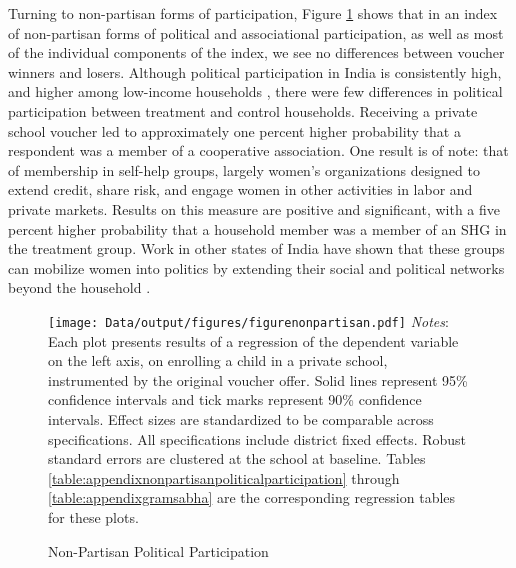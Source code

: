 \documentclass[hidelinks, 12pt, titlepage]{article}
\begin{document}
		Turning to non-partisan forms of participation, Figure \ref{fig:nonpartisan} shows that in an index of non-partisan forms of political and associational participation, as well as most of the individual components of the index, we see no differences between voucher winners and losers.  Although political participation in India is consistently high, and higher among low-income households \citep{Banerjee2011a}, there were few differences in political participation between treatment and control households.  Receiving a private school voucher led to approximately one percent higher probability that a respondent was a member of a cooperative association. One result is of note: that of membership in self-help groups, largely women's organizations designed to extend credit, share risk, and engage women in other activities in labor and private markets.  Results on this measure are positive and significant, with a five percent higher probability that a household member was a member of an SHG in the treatment group. Work in other states of India have shown that these groups can mobilize women into politics by extending their social and political networks beyond the household \citep{Prillaman2021}.

		\begin{figure}[htbp]
			\caption{Non-Partisan Political Participation\label{fig:nonpartisan}}
			\centering
			\begin{minipage}{5.5in}
				\texttt{[image: Data/output/figures/figurenonpartisan.pdf]}
				\footnotesize
				\emph{Notes}: Each plot presents results of a regression of the dependent variable on the left axis, on enrolling a child in a private school, instrumented by the original voucher offer.  Solid lines represent 95\% confidence intervals and tick marks represent 90\% confidence intervals.  Effect sizes are standardized to be comparable across specifications.  All specifications include district fixed effects.  Robust standard errors are clustered at the school at baseline. Tables \ref{table:appendixnonpartisanpoliticalparticipation} through \ref{table:appendixgramsabha} are the corresponding regression tables for these plots.
			\end{minipage}
		\end{figure}
\end{document}
